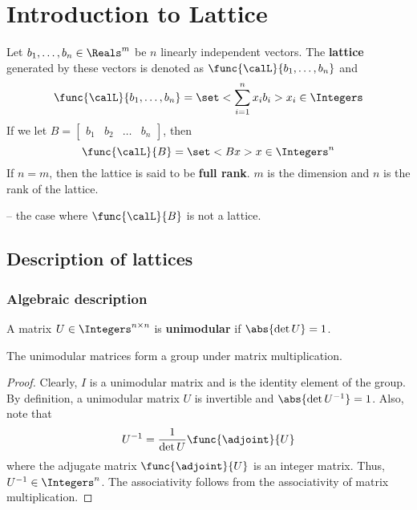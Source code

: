 \chapter{Introduction to Lattice}
\begin{definition}
    Let \(b_1, \dots, b_n \in \Reals^m\) be \(n\) linearly independent vectors. The \textbf{lattice} generated by these vectors is denoted as \(\func{\calL}{b_1, \dots, b_n}\) and 
    \begin{equation*}
        \func{\calL}{b_1, \dots, b_n} = \set< \sum_{i = 1}^n x_i b_i>{x_i \in \Integers}
    \end{equation*}
    If we let \(B = \begin{bmatrix}
        b_1 & b_2 & \dots & b_n
    \end{bmatrix}\), then  
    \begin{equation*}
        \func{\calL}{B} = \set<Bx>{x \in \Integers^n}
    \end{equation*}
    If \(n = m\), then the lattice is said to be \textbf{full rank}. \(m\) is the dimension and \(n\) is the rank of the lattice.
\end{definition}

-- the case where \(\func{\calL}{B}\) is not a lattice.
\section{Description of lattices}
\subsection{Algebraic description}
\begin{definition}
    A matrix \(U \in \Integers^{n \times n}\) is \textbf{unimodular} if \(\abs{\det U} = 1\). 
\end{definition}
\begin{proposition}
    The unimodular matrices form a group under matrix multiplication.
\end{proposition}
\begin{proof}
    Clearly, \(I\) is a unimodular matrix and is the identity element of the group. By definition, a unimodular matrix \(U\) is invertible and \(\abs{\det U^{-1}} = 1\). Also, note that 
    \begin{equation*}
        U^{-1} = \frac{1}{\det U} \func{\adjoint}{U}
    \end{equation*}
    where the adjugate matrix \(\func{\adjoint}{U}\) is an integer matrix. Thus, \(U^{-1} \in \Integers^{n}\). The associativity follows from the associativity of matrix multiplication.
\end{proof}

